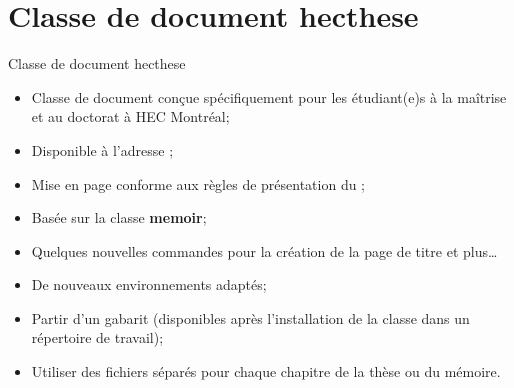 
\section{Classe de document hecthese}

\begin{frame}{Classe de document hecthese}
	\begin{itemize}
		\item Classe de document conçue spécifiquement pour les étudiant(e)s à la maîtrise
			et au doctorat à HEC Montréal;
		\item Disponible à l'adresse ;
		\item Mise en page conforme aux règles de présentation du 
			;
		\item Basée sur la classe \textbf{memoir};
		\item Quelques nouvelles commandes pour la création de la page de titre et plus\ldots
		\item De nouveaux environnements adaptés;
		\item Partir d’un gabarit (disponibles après l’installation de la classe dans un répertoire de travail);
		\item Utiliser des fichiers séparés pour chaque chapitre de la thèse ou du mémoire.
	\end{itemize}
\end{frame}